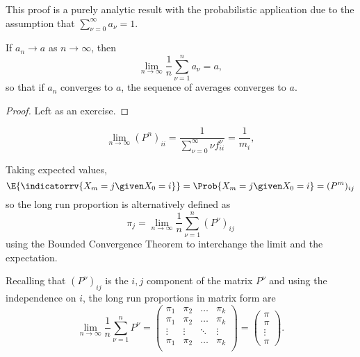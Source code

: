 \documentclass[12pt]{article}
\begin{document}
\begin{remark}
    This proof is a purely analytic result with the probabilistic
    application due to the assumption that \( \sum_{\nu=0}^{\infty} a_\nu
    = 1 \).
\end{remark}

\begin{lemma}
    If \( a_n \to a \) as \( n \to \infty \), then
    \[
        \lim_{n \to \infty} \frac{1}{n} \sum\limits_{\nu=1}^{n} a_{\nu}
        = a,
    \] so that if \( a_n \) converges to \( a \), the sequence of
    averages converges to \( a \).
\end{lemma}

\begin{proof}
    Left as an exercise.
\end{proof}

\begin{corollary}
    \[
        \lim_{n \to \infty} (P^{n})_{ii} = \frac{1}{\sum\limits_{\nu=0}^
        {\infty} \nu f^{\nu}_{ii}} = \frac{1}{m_i},
    \]
\end{corollary}

\begin{remark}
    Taking expected values,
    \[
        \E{\indicatorrv{X_m = j \given X_0 = i}} = \Prob{X_m = j \given
        X_0 = i} = (P^m)_{ij}
    \] so the long run proportion is alternatively defined as
    \[
        \pi_j = \lim_{n \to \infty} \frac{1}{n} \sum\limits_{\nu=1}^n (P^
        {\nu})_ {ij}
    \] using the Bounded Convergence Theorem to interchange the limit
    and the expectation.
\end{remark}

\begin{remark}
    Recalling that \( (P^{\nu})_{ij} \) is the \( i,j \) component of
    the matrix \( P^{\nu} \) and using the independence on \( i \), the
    long run proportions in matrix form are
    \[
        \lim_{n \to \infty} \frac{1}{n} \sum\limits_{\nu=1}^n P^{\nu} =
        \begin{pmatrix}
            \pi_1 & \pi_2 & \ldots & \pi_k \\
            \pi_1 & \pi_2 & \ldots & \pi_k \\
            \vdots & \vdots & \ddots & \vdots \\
            \pi_1 & \pi_2 & \ldots & \pi_k \\
        \end{pmatrix}
        =
        \begin{pmatrix}
            \pi \\
            \pi \\
            \vdots \\
            \pi
        \end{pmatrix}.
    \]
\end{remark}
\end{document}
